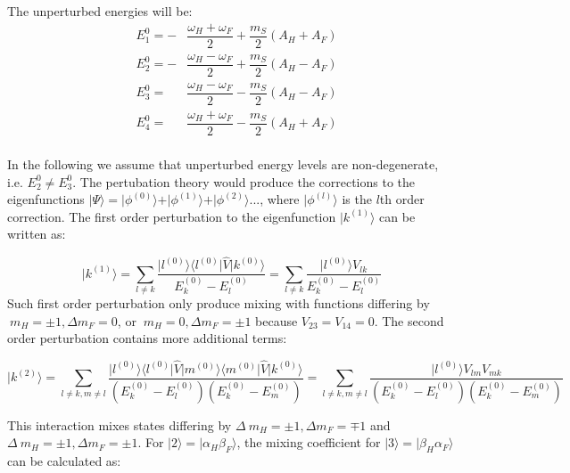 \documentclass[a4paper, 12pt]{article}
\begin{document}
The unperturbed energies will be:
\begin{equation}\label{eq:level_energies}
	\begin{array}{lll}
  &E_1^{0} = - &\dfrac{\omega_H + \omega_F}{2} + \dfrac{m_S}{2}(A_H + A_F) \\
  &E_2^{0} = - &\dfrac{\omega_H - \omega_F}{2} + \dfrac{m_S}{2}(A_H - A_F) \\
  &E_3^{0} =  &\dfrac{\omega_H - \omega_F}{2} - \dfrac{m_S}{2}(A_H - A_F) \\
  &E_4^{0} =  &\dfrac{\omega_H + \omega_F}{2} - \dfrac{m_S}{2}(A_H + A_F) \\

	\end{array}
\end{equation}

In the following we assume that unperturbed energy levels are non-degenerate, i.e. $E_2^0 \neq E_3^0$.
The pertubation theory would produce the corrections to the eigenfunctions $\vert \Psi \rangle = \vert \phi^{(0)} \rangle + \vert \phi^{(1)} \rangle + \vert \phi^{(2)} \rangle ...$, where $\vert \phi^{(l)} \rangle$ is the $l$th order correction. The first order perturbation to the eigenfunction $\vert k^{(1)} \rangle $ can be written as:

\begin{equation}
     \vert k^{(1)} \rangle = \sum_{l \neq k} \dfrac{\vert l^{(0)}  \rangle  \langle l^{(0)}  \vert \hat{V}  \vert k^{(0)} \rangle  }{E_k^{(0)} - E_l^{(0)}} = \sum_{l \neq k} \dfrac{\vert l^{(0)}  \rangle  V_{lk} }{E_k^{(0)} - E_l^{(0)}} 
\end{equation}
Such first order perturbation only produce mixing with functions differing by $\ m_H = \pm 1, \Delta m_F =0$, or  $\ m_H = 0, \Delta m_F =\pm 1$ because $V_{23} = V_{14} = 0$. The second order perturbation contains more additional terms:

\begin{equation}
\vert k^{(2)} \rangle = \sum_{l \neq k, m \neq l } \dfrac{\vert l^{(0)}  \rangle  \langle l^{(0)}  \vert \hat{V}  \vert m^{(0)} \rangle   \langle m^{(0)}  \vert \hat{V}  \vert k^{(0)} \rangle  }{(E_k^{(0)} - E_l^{(0)})(E_k^{(0)} - E_m^{(0)})} = \sum_{l \neq k, m \neq l} \dfrac{\vert l^{(0)}  \rangle  V_{lm} V_{mk} }{(E_k^{(0)} - E_l^{(0)})(E_k^{(0)} - E_m^{(0)})} 
\end{equation}

This interaction mixes states differing by  $\Delta \ m_H = \pm 1, \Delta m_F =\mp 1$ and $\Delta \ m_H = \pm 1, \Delta m_F =\pm 1$. For $\vert 2 \rangle = \vert \alpha_H \beta_F \rangle  $, the mixing coefficient for $\vert 3 \rangle = \vert \beta_H \alpha_F \rangle  $ can be calculated as:
\end{document}
